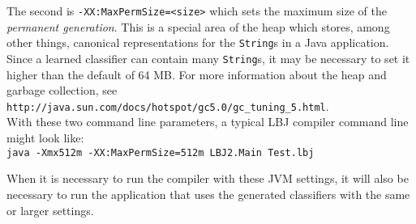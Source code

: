The second is {\tt -XX:MaxPermSize=<size>} which sets the maximum size of the
\emph{permanent generation}.  This is a special area of the heap which stores,
among other things, canonical representations for the {\tt String}s in a Java
application.  Since a learned classifier can contain many {\tt String}s, it
may be necessary to set it higher than the default of 64 MB.  For more
information about the heap and garbage collection, see {\tt
http://java.sun.com/docs/hotspot/gc5.0/gc\_tuning\_5.html}. \\

With these two command line parameters, a typical LBJ compiler command line
might look like: \\

\vspace{-.25cm}
{\tt java -Xmx512m -XX:MaxPermSize=512m LBJ2.Main Test.lbj} \\
\vspace{-.25cm}

\noindent
When it is necessary to run the compiler with these JVM settings, it will also
be necessary to run the application that uses the generated classifiers with
the same or larger settings.

